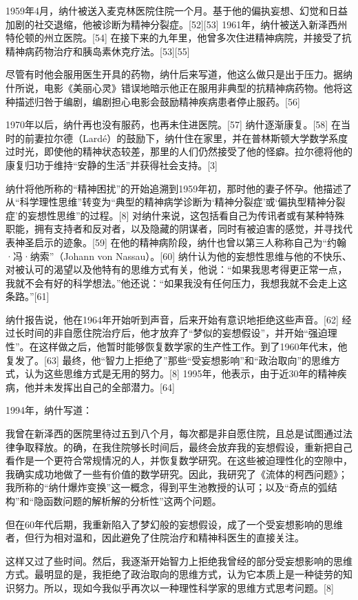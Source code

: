 1959年4月，纳什被送入麦克林医院住院一个月。基于他的偏执妄想、幻觉和日益加剧的社交退缩，他被诊断为精神分裂症。[52][53] 1961年，纳什被送入新泽西州特伦顿的州立医院。[54] 在接下来的九年里，他曾多次住进精神病院，并接受了抗精神病药物治疗和胰岛素休克疗法。[53][55]

尽管有时他会服用医生开具的药物，纳什后来写道，他这么做只是出于压力。据纳什所说，电影《美丽心灵》错误地暗示他正在服用非典型的抗精神病药物。他将这种描述归咎于编剧，编剧担心电影会鼓励精神疾病患者停止服药。[56]

1970年以后，纳什再也没有服药，也再未住进医院。[57] 纳什逐渐康复。[58] 在当时的前妻拉尔德（Lardé）的鼓励下，纳什住在家里，并在普林斯顿大学数学系度过时光，即使他的精神状态较差，那里的人们仍然接受了他的怪癖。拉尔德将他的康复归功于维持“安静的生活”并获得社会支持。[3]

纳什将他所称的“精神困扰”的开始追溯到1959年初，那时他的妻子怀孕。他描述了从“科学理性思维”转变为“典型的精神病学诊断为‘精神分裂症’或‘偏执型精神分裂症’的妄想性思维”的过程。[8] 对纳什来说，这包括看自己为传讯者或有某种特殊职能，拥有支持者和反对者，以及隐藏的阴谋者，同时有被迫害的感觉，并寻找代表神圣启示的迹象。[59] 在他的精神病阶段，纳什也曾以第三人称称自己为“约翰·冯·纳索”（Johann von Nassau）。[60] 纳什认为他的妄想性思维与他的不快乐、对被认可的渴望以及他特有的思维方式有关，他说：“如果我思考得更正常一点，我就不会有好的科学想法。”他还说：“如果我没有任何压力，我想我就不会走上这条路。”[61]

纳什报告说，他在1964年开始听到声音，后来开始有意识地拒绝这些声音。[62] 经过长时间的非自愿住院治疗后，他才放弃了“梦似的妄想假设”，并开始“强迫理性”。在这样做之后，他暂时能够恢复数学家的生产性工作。到了1960年代末，他复发了。[63] 最终，他“智力上拒绝了”那些“受妄想影响”和“政治取向”的思维方式，认为这些思维方式是无用的努力。[8] 1995年，他表示，由于近30年的精神疾病，他并未发挥出自己的全部潜力。[64]

1994年，纳什写道：

我曾在新泽西的医院里待过五到八个月，每次都是非自愿住院，且总是试图通过法律争取释放。的确，在我住院够长时间后，最终会放弃我的妄想假设，重新把自己看作是一个更符合常规情况的人，并恢复数学研究。在这些被迫理性化的空隙中，我确实成功地做了一些有价值的数学研究。因此，我研究了《流体的柯西问题》；我所称的“纳什爆炸变换”这一概念，得到平生池教授的认可；以及“奇点的弧结构”和“隐函数问题的解析解的分析性”这两个问题。

但在60年代后期，我重新陷入了梦幻般的妄想假设，成了一个受妄想影响的思维者，但行为相对温和，因此避免了住院治疗和精神科医生的直接关注。

这样又过了些时间。然后，我逐渐开始智力上拒绝我曾经的部分受妄想影响的思维方式。最明显的是，我拒绝了政治取向的思维方式，认为它本质上是一种徒劳的知识努力。所以，现如今我似乎再次以一种理性科学家的思维方式思考问题。[8]
